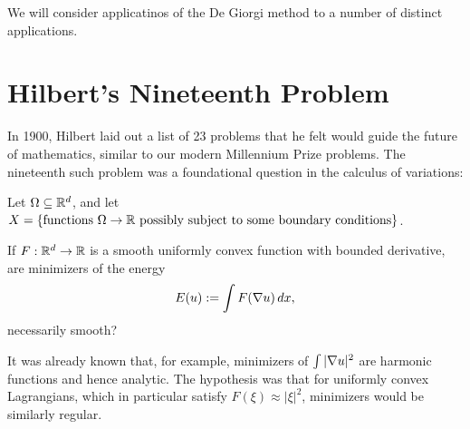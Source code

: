 %
%
%
%
%
%
%

We will consider applicatinos of the De Giorgi method to a number of distinct applications.  

\section{Hilbert's Nineteenth Problem} \label{sec:intro-19}

In 1900, Hilbert laid out a list of 23 problems that he felt would guide the future of mathematics, similar to our modern Millennium Prize problems.  The nineteenth such problem was a foundational question in the calculus of variations: 
\begin{problem}
Let $\Omega \subseteq \mathbb{R}^d$, and let $X = \{\textrm{functions }\Omega \to \mathbb{R}\textrm{ possibly subject to some boundary conditions}\}$.  

If $F:\mathbb{R}^d \to \mathbb{R}$ is a smooth uniformly convex function with bounded derivative, 
are minimizers of the energy
\[ E(u) := \int F(\nabla u) \,dx, \]
necessarily smooth?
\end{problem}
It was already known that, for example, minimizers of $\int |\nabla u|^2$ are harmonic functions and hence analytic.  The hypothesis was that for uniformly convex Lagrangians, which in particular satisfy $F(\xi) \approx |\xi|^2$, minimizers would be similarly regular.  

